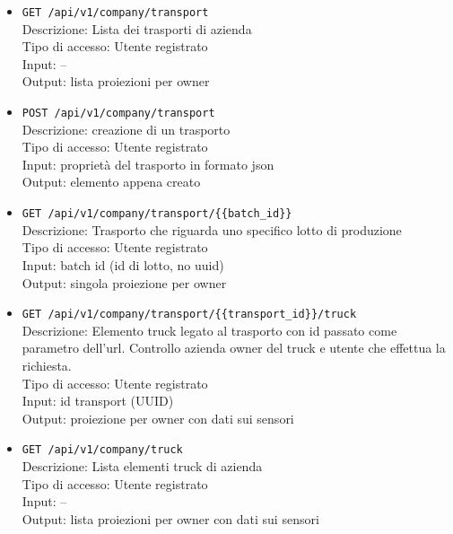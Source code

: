\documentclass[a4paper,11pt]{article}
\begin{document}
\begin{itemize}

  \item \texttt{GET /api/v1/company/transport}
        \\ Descrizione: Lista dei trasporti di azienda
        \\ Tipo di accesso: Utente registrato
        \\ Input: --
        \\ Output: lista proiezioni per owner

  \item \texttt{POST /api/v1/company/transport}
        \\ Descrizione: creazione di un trasporto
        \\ Tipo di accesso: Utente registrato
        \\ Input: proprietà del trasporto in formato json
        \\ Output: elemento appena creato

  \item \texttt{GET /api/v1/company/transport/\{\{batch\_id\}\}}
        \\ Descrizione: Trasporto che riguarda uno specifico lotto di produzione
        \\ Tipo di accesso: Utente registrato
        \\ Input: batch id (id di lotto, no uuid)
        \\ Output: singola proiezione per owner

  \item \texttt{GET /api/v1/company/transport/\{\{transport\_id\}\}/truck}
        \\ Descrizione: Elemento truck legato al trasporto con id passato come parametro dell'url. Controllo azienda owner del truck e utente che effettua la richiesta.
        \\ Tipo di accesso: Utente registrato
        \\ Input: id transport (UUID)
        \\ Output: proiezione per owner con dati sui sensori

  \item \texttt{GET /api/v1/company/truck}
        \\ Descrizione: Lista elementi truck di azienda
        \\ Tipo di accesso: Utente registrato
        \\ Input: --
        \\ Output: lista proiezioni per owner con dati sui sensori


\end{itemize}
\end{document}

